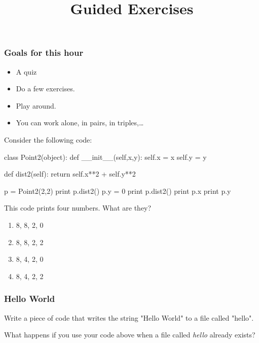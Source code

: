 
\title{Guided Exercises}
\usepackage{amsmath}

\frame{\maketitle}

\begin{frame}
\frametitle{Goals for this hour}

\begin{itemize}
\item A quiz
\item Do a few exercises.
\item Play around.
\item You can work alone, in pairs, in triples,\ldots
\end{itemize}

\end{frame}


\begin{frame}[fragile]
{}


Consider the following code:

\begin{python}
class Point2(object):
    def __init__(self,x,y):
        self.x = x
        self.y = y

    def dist2(self):
        return self.x**2 + self.y**2 

p = Point2(2,2)
print p.dist2()
p.y = 0
print p.dist2()
print p.x
print p.y
\end{python}

This code prints four numbers. What are they?

\begin{enumerate}[a]
\item 8, 8, 2, 0
\item 8, 8, 2, 2
\item 8, 4, 2, 0
\item 8, 4, 2, 2
\end{enumerate}

\end{frame}

\begin{frame}[fragile]
\frametitle{Hello World}

Write a piece of code that writes the string "Hello World" to a file called "hello".

\bigskip
What happens if you use your code above when a file called \textit{hello} already exists?

\end{frame}

